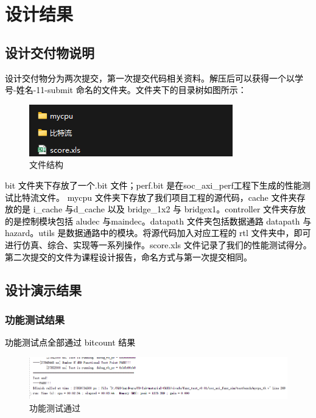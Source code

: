 \section{设计结果}

\subsection{设计交付物说明}
\textcolor{black}{设计交付物分为两次提交，第一次提交代码相关资料。解压后可以获得一个以学号-姓名-11-submit 命名的文件夹。文件夹下的目录树如图所示：}

\begin{figure}[htbp]
    \centering
    \includegraphics[width=\textwidth]{image/fileconstruct.png}
    \caption{文件结构}
\end{figure}
    
\textcolor{black}{bit 文件夹下存放了一个.bit 文件；perf.bit 是在soc\_axi\_perf工程下生成的性能测试比特流文件。
mycpu 文件夹下存放了我们项目工程的源代码，cache 文件夹存放的是 i\_cache 与d\_cache 以及 bridge\_1x2 与 bridge\2x1。controller 文件夹存放的是控制模块包括 aludec 与maindec。datapath 文件夹包括数据通路 datapath 与 hazard。utils 是数据通路中的模块。将源代码加入对应工程的 rtl 文件夹中，即可进行仿真、综合、实现等一系列操作。score.xls 文件记录了我们的性能测试得分。第二次提交的文件为课程设计报告，命名方式与第一次提交相同。
}

\subsection{设计演示结果} 
\subsubsection{功能测试结果}
\textcolor{black}{功能测试点全部通过}
\textcolor{black}{bitcount 结果}\\
\begin{figure}[htbp]
    \centering
    \includegraphics[width=\textwidth]{image/functest.png}
    \caption{功能测试通过}
\end{figure}

